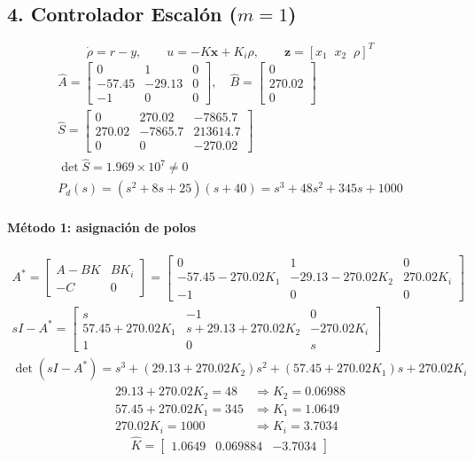 \documentclass[11pt]{article}
\begin{document}
\subsection*{4. Controlador Escalón ($m=1$)}
\[\dot\rho=r-y,\qquad u=-K\mathbf{x}+K_i\rho,\qquad \mathbf{z}=[x_1\;\;x_2\;\;\rho]^T\]
\begin{gather*}
\hat{A}=\begin{bmatrix}0 & 1 & 0 \\ -57.45 & -29.13 & 0 \\ -1 & 0 & 0\end{bmatrix},\quad \hat{B}=\begin{bmatrix}0 \\ 270.02 \\ 0\end{bmatrix}\\
\hat{S}=\begin{bmatrix}0 & 270.02 & -7865.7 \\ 270.02 & -7865.7 & 213614.7 \\ 0 & 0 & -270.02\end{bmatrix}\\
\det\hat{S}=1.969\times10^{7}\neq0\\
P_d(s)=(s^2+8s+25)(s+40)=s^{3} + 48s^{2} + 345s + 1000
\end{gather*}
\paragraph{Método 1: asignación de polos}
\begin{gather*}
A^*=\begin{bmatrix}A-BK&BK_i\\-C&0\end{bmatrix}=\begin{bmatrix}0&1&0\\-57.45-270.02K_1&-29.13-270.02K_2&270.02K_i\\-1&0&0\end{bmatrix}\\
sI-A^*=\begin{bmatrix}s&-1&0\\57.45+270.02K_1&s+29.13+270.02K_2&-270.02K_i\\1&0&s\end{bmatrix}\\
\det(sI-A^*)=s^3+(29.13+270.02K_2)s^2+(57.45+270.02K_1)s+270.02K_i
\end{gather*}
\begin{align*}
29.13+270.02K_2=48 &\Rightarrow K_2=0.06988\\
57.45+270.02K_1=345 &\Rightarrow K_1=1.0649\\
270.02K_i=1000 &\Rightarrow K_i=3.7034
\end{align*}
\[\hat{K}=\begin{bmatrix}1.0649 & 0.069884 & -3.7034\end{bmatrix}\]
\end{document}
